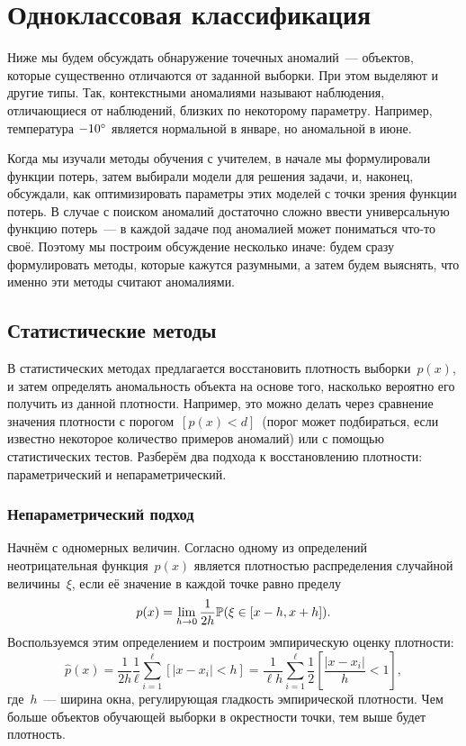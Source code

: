 \documentclass[12pt,fleqn]{article}
\begin{document}
\section{Одноклассовая классификация}

Ниже мы будем обсуждать обнаружение точечных аномалий~--- объектов,
которые существенно отличаются от заданной выборки.
При этом выделяют и другие типы.
Так, контекстными аномалиями называют наблюдения, отличающиеся
от наблюдений, близких по некоторому параметру.
Например, температура $-10\degree$ является нормальной в январе,
но аномальной в июне.

Когда мы изучали методы обучения с учителем,
в начале мы формулировали функции потерь,
затем выбирали модели для решения задачи,
и, наконец, обсуждали, как оптимизировать параметры этих моделей с точки зрения функции потерь.
В случае с поиском аномалий достаточно сложно ввести универсальную функцию потерь~---
в каждой задаче под аномалией может пониматься что-то своё.
Поэтому мы построим обсуждение несколько иначе: будем сразу формулировать методы,
которые кажутся разумными, а затем будем выяснять, что именно эти методы считают аномалиями.

\subsection{Статистические методы}

В статистических методах предлагается восстановить плотность выборки~$p(x)$,
и затем определять аномальность объекта на основе того,
насколько вероятно его получить из данной плотности.
Например, это можно делать через сравнение значения плотности с порогом~$[p(x) < d]$~(порог
может подбираться, если известно некоторое количество примеров аномалий)
или с помощью статистических тестов.
Разберём два подхода к восстановлению плотности: параметрический
и непараметрический.

\subsubsection{Непараметрический подход}

Начнём с одномерных величин.
Согласно одному из определений неотрицательная функция~$p(x)$
является плотностью распределения случайной величины~$\xi$, если её значение в каждой точке
равно пределу
\[
    p(x)
    =
    \lim_{h \to 0}
        \frac{1}{2h}
        \mathbb{P}(\xi \in [x - h, x + h]).
\]
Воспользуемся этим определением и построим эмпирическую оценку плотности:
\[
    \hat p(x)
    =
    \frac{1}{2h} \frac{1}{\ell}
    \sum_{i = 1}^{\ell}
        \left[
            |x - x_i| < h
        \right]
    =
    \frac{1}{\ell h}
    \sum_{i = 1}^{\ell}
        \frac12
        \left[
            \frac{|x - x_i|}{h} < 1
        \right],
\]
где~$h$~--- ширина окна, регулирующая гладкость эмпирической плотности.
Чем больше объектов обучающей выборки в окрестности точки, тем выше будет плотность.
\end{document}
